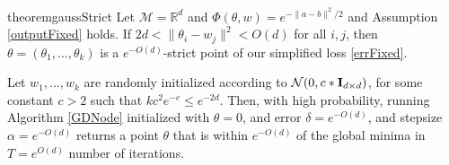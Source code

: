 \documentclass{article}
\newcommand{\R}{{\mathbb{R}}}
\begin{document}
\begin{restatable}{theorem}{gaussStrict}
\label{GaussStrict}
Let $\mathcal{M} = \R^d$ and $\Phi(\theta,w) = e^{-\|a-b\|^2/2}$ and Assumption \ref{outputFixed} holds. If $2d < \|\theta_i - w_j\|^2 < O(d)$ for all $i, j$, then $\theta = (\theta_1,...,\theta_k)$ is a $e^{-O(d)}$-strict point of our simplified loss \eqref{errFixed}.

Let $w_1,...,w_k$ are randomly initialized according to $\mathcal{N}(0, c*{\bf I}_{d\times d})$, for some constant $c > 2$ such that $kc^2e^{-c} \leq e^{-2d}$. Then, with high probability, running Algorithm \ref{GDNode} initialized with $\theta = 0$, and error  $\delta = e^{-O(d)}$, and stepsize $\alpha = e^{-O(d)}$ returns a point $\theta$ that is within $e^{-O(d)}$ of the global minima in $T = e^{O(d)}$ number of iterations.
\end{restatable}
\end{document}
